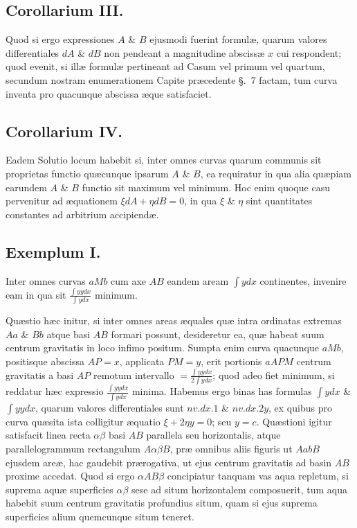 \subsection*{Corollarium III.}
Quod si ergo expressiones $A$ \& $B$ ejusmodi fuerint formulæ, quarum valores differentiales $dA$ \& $dB$ non pendeant a magnitudine abscissæ $x$ cui respondent; quod evenit, si illæ formulæ pertineant ad Casum vel primum vel quartum, secundum nostram enumerationem Capite præcedente §.~7 factam, tum curva inventa pro quacunque abscissa æque satisfaciet.

\subsection*{Corollarium IV.}
Eadem Solutio locum habebit si, inter omnes curvas quarum communis sit proprietas functio quæcunque ipsarum $A$ \& $B$, ea requiratur in qua alia quæpiam earundem $A$ \& $B$ functio sit maximum vel minimum. Hoc enim quoque casu pervenitur ad æquationem $\xi dA+\eta dB=0$, in qua $\xi$ \& $\eta$ sint quantitates constantes ad arbitrium accipiendæ.

\subsection*{Exemplum I.}
Inter omnes curvas $aMb$ cum axe $AB$ eandem aream $\int ydx$ continentes, invenire eam in qua sit $\frac{\int yydx}{\int ydx}$ minimum.

Quæstio hæc initur, si inter omnes areas æquales quæ intra ordinatas extremas $Aa$ \& $Bb$ atque basi $AB$ formari possunt, desideretur ea, quæ habeat suum centrum gravitatis in loco infimo positum. Sumpta enim curva quacunque $aMb$, positisque abscissa $AP=x$, applicata $PM=y$, erit portionis $aAPM$ centrum gravitatis a basi $AP$ remotum intervallo $=\frac{\int yydx}{2\int ydx}$; quod adeo fiet minimum, si reddatur hæc expressio $\frac{\int yydx}{\int ydx}$ minima. Habemus ergo binas has formulas $\int ydx$ \& $\int yydx$, quarum valores differentiales sunt $nv.dx.1$ \& $nv.dx.2y$, ex
quibus pro curva quæsita ista colligitur æquatio $\xi+2\eta y=0$; seu $y=c$. Quæstioni igitur satisfacit linea recta $\alpha\beta$ basi $AB$ parallela seu horizontalis, atque parallelogrammum rectangulum $A\alpha\beta B$, præ omnibus aliis figuris ut $AabB$ ejusdem areæ, hac gaudebit prærogativa, ut ejus centrum gravitatis ad basin $AB$ proxime accedat. Quod si ergo $\alpha AB\beta$ concipiatur tanquam vas aqua repletum, si suprema aquæ superficies $\alpha\beta$ sese ad situm horizontalem composuerit, tum aqua habebit suum centrum gravitatis profundius situm, quam si ejus suprema superficies alium quemcunque situm teneret.

